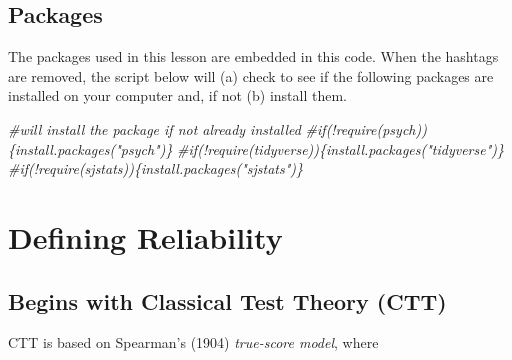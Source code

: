 \documentclass[
  english,
]{book}
\newenvironment{Shaded}{\begin{snugshade}}{\end{snugshade}}
\newcommand{\CommentTok}[1]{\textcolor[rgb]{0.56,0.35,0.01}{\textit{#1}}}
\begin{document}
\hypertarget{packages-3}{%
\subsection{Packages}\label{packages-3}}

The packages used in this lesson are embedded in this code. When the hashtags are removed, the script below will (a) check to see if the following packages are installed on your computer and, if not (b) install them.

\begin{Shaded}
\begin{Highlighting}[]
\CommentTok{\#will install the package if not already installed}
\CommentTok{\#if(!require(psych))\{install.packages("psych")\}}
\CommentTok{\#if(!require(tidyverse))\{install.packages("tidyverse")\}}
\CommentTok{\#if(!require(sjstats))\{install.packages("sjstats")\}}
\end{Highlighting}
\end{Shaded}

\hypertarget{defining-reliability}{%
\section{Defining Reliability}\label{defining-reliability}}

\hypertarget{begins-with-classical-test-theory-ctt}{%
\subsection{Begins with Classical Test Theory (CTT)}\label{begins-with-classical-test-theory-ctt}}

CTT is based on Spearman's (1904) \emph{true-score model}, where
\end{document}

